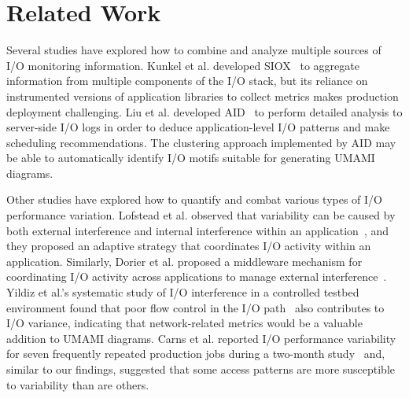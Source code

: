 \section{Related Work} \label{sec:related}

Several studies have explored how to combine and analyze multiple sources of I/O monitoring information.
Kunkel et al. developed SIOX~\cite{Kunkel:2014:SAC:2769884.2769901} to aggregate information from multiple components of the I/O stack, 
but its reliance on instrumented versions of application libraries to collect metrics makes production deployment challenging.
Liu et al. developed AID~\cite{Liu2016} to perform detailed analysis to server-side I/O logs in order to deduce application-level I/O patterns and make scheduling recommendations.  The clustering approach implemented by AID may be able to automatically identify I/O motifs suitable for generating UMAMI diagrams.

Other studies have explored how to quantify and combat various types of I/O performance variation.
Lofstead et al. observed that variability can be caused by both external interference and internal interference within an application~\cite{Lofstead2010}, and they proposed an adaptive strategy that coordinates I/O activity within an application.
Similarly, Dorier et al. proposed a middleware mechanism for coordinating I/O activity across applications to manage external interference~\cite{dorier2014calciom}.
Yildiz et al.'s systematic study of I/O interference in a controlled testbed environment found that poor flow control in the I/O path~\cite{Yildiz2016} also contributes to I/O variance, indicating that network-related metrics would be a valuable addition to UMAMI diagrams.
Carns et al. reported I/O performance variability for seven frequently repeated production jobs during a two-month study~\cite{carns2011understanding} and, similar to our findings, suggested that some access patterns are more susceptible to variability than are others.
